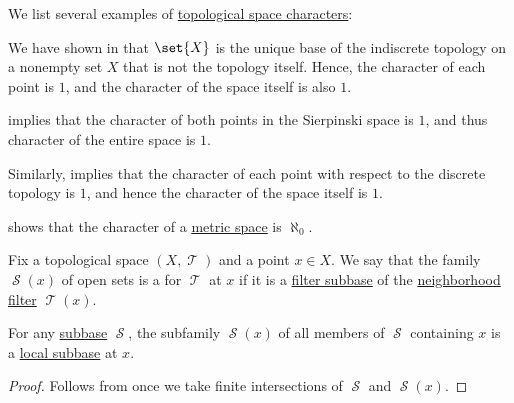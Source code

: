 \begin{example}\label{ex:def:topological_space_character}
  We list several examples of \hyperref[def:topological_space_character]{topological space characters}:
  \begin{thmenum}
     We have shown in  that \( \set{ X } \) is the unique base of the indiscrete topology on a nonempty set \( X \) that is not the topology itself. Hence, the character of each point is \( 1 \), and the character of the space itself is also \( 1 \).

      implies that the character of both points in the Sierpinski space is \( 1 \), and thus character of the entire space is \( 1 \).

     Similarly,  implies that the character of each point with respect to the discrete topology is \( 1 \), and hence the character of the space itself is \( 1 \).

      shows that the character of a \hyperref[def:metric_space]{metric space} is \( \aleph_0 \).
  \end{thmenum}
\end{example}

\begin{definition}\label{def:topological_local_subbase}\mimprovised
  Fix a topological space \( (X, \mscrT) \) and a point \( x \in X \). We say that the family \( \mscrS(x) \) of open sets is a  for \( \mscrT \) at \( x \) if it is a \hyperref[def:filter_subbase]{filter subbase} of the \hyperref[def:neighborhood_system]{neighborhood filter} \( \mscrT(x) \).
\end{definition}

\begin{proposition}\label{thm:global_subbase_to_local_subbase}
  For any \hyperref[def:topological_subbase]{subbase} \( \mscrS \), the subfamily \( \mscrS(x) \) of all members of \( \mscrS \) containing \( x \) is a \hyperref[def:topological_local_subbase]{local subbase} at \( x \).
\end{proposition}
\begin{proof}
  Follows from  once we take finite intersections of \( \mscrS \) and \( \mscrS(x) \).
\end{proof}

